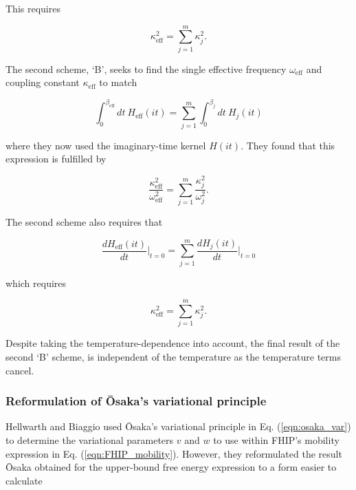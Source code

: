 This requires

\begin{equation}
    \kappa_{\text{eff}}^2 = \sum_{j=1}^m \kappa_j^2.
\end{equation}

The second scheme, `B', seeks to find the single effective frequency $\omega_{\text{eff}}$ and coupling constant $\kappa_{\text{eff}}$ to match

\begin{equation}
    \int^{\beta_{\text{eff}}}_0 dt\ H_{\text{eff}}(it) = \sum_{j = 1}^m \int^{\beta_j}_0 dt\ H_j(it)
\end{equation}

where they now used the imaginary-time kernel $H(it)$. They found that this expression is fulfilled by

\begin{equation}
    \frac{\kappa_{\text{eff}}^2}{\omega_{\text{eff}}^2} = \sum_{j = 1}^m \frac{\kappa_{j}^2}{\omega_{j}^2}.
\end{equation}

The second scheme also requires that

\begin{equation}
    \frac{dH_{\text{eff}}(it)}{dt} \biggr\rvert_{t=0} = \sum_{j=1}^m \frac{dH_{j}(it)}{dt} \biggr\rvert_{t=0}
\end{equation}

which requires

\begin{equation} \label{eqn:hellwarth_scheme_f}
    \kappa_{\text{eff}}^2 = \sum_{j=1}^m \kappa_j^2.
\end{equation}

Despite taking the temperature-dependence into account, the final result of the second `B' scheme, is independent of the temperature as the temperature terms cancel.

\subsubsection{Reformulation of \=Osaka's variational principle}
\label{subsubsec:2-3-3-6}

Hellwarth and Biaggio used \=Osaka's variational principle in Eq. (\ref{eqn:osaka_var}) to determine the variational parameters $v$ and $w$ to use within FHIP's mobility expression in Eq. (\ref{eqn:FHIP_mobility}). However, they reformulated the result \=Osaka obtained for the upper-bound free energy expression to a form easier to calculate

